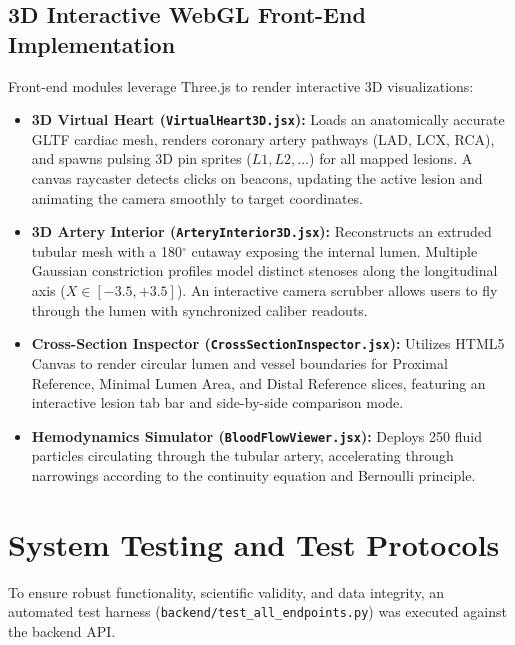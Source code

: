 \subsection{3D Interactive WebGL Front-End Implementation}
Front-end modules leverage Three.js to render interactive 3D visualizations:
\begin{itemize}
    \item \textbf{3D Virtual Heart (\texttt{VirtualHeart3D.jsx}):} Loads an anatomically accurate GLTF cardiac mesh, renders coronary artery pathways (LAD, LCX, RCA), and spawns pulsing 3D pin sprites ($L1, L2, \dots$) for all mapped lesions. A canvas raycaster detects clicks on beacons, updating the active lesion and animating the camera smoothly to target coordinates.
    \item \textbf{3D Artery Interior (\texttt{ArteryInterior3D.jsx}):} Reconstructs an extruded tubular mesh with a 180$^\circ$ cutaway exposing the internal lumen. Multiple Gaussian constriction profiles model distinct stenoses along the longitudinal axis ($X \in [-3.5, +3.5]$). An interactive camera scrubber allows users to fly through the lumen with synchronized caliber readouts.
    \item \textbf{Cross-Section Inspector (\texttt{CrossSectionInspector.jsx}):} Utilizes HTML5 Canvas to render circular lumen and vessel boundaries for Proximal Reference, Minimal Lumen Area, and Distal Reference slices, featuring an interactive lesion tab bar and side-by-side comparison mode.
    \item \textbf{Hemodynamics Simulator (\texttt{BloodFlowViewer.jsx}):} Deploys 250 fluid particles circulating through the tubular artery, accelerating through narrowings according to the continuity equation and Bernoulli principle.
\end{itemize}

\section{System Testing and Test Protocols}
To ensure robust functionality, scientific validity, and data integrity, an automated test harness (\texttt{backend/test\_all\_endpoints.py}) was executed against the backend API.


